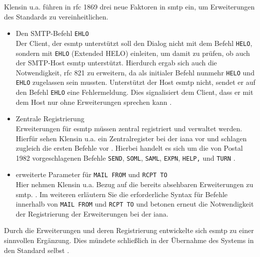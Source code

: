 
Klensin u.a. führen in \ac{rfc} 1869 drei neue Faktoren in \ac{smtp} ein, um Erweiterungen des Standards zu vereinheitlichen.

\begin{itemize}
	\item{Den SMTP-Befehl \verb+EHLO+}\\
	Der Client, der \ac{esmtp} unterstützt soll den Dialog nicht mit dem Befehl \verb+HELO+, sondern mit \verb+EHLO+ (Extended HELO) einleiten, um damit zu prüfen, ob auch der SMTP-Host \ac{esmtp} unterstützt. Hierdurch ergab sich auch die Notwendigkeit, \ac{rfc} 821 zu erweitern, da als initialer Befehl nunmehr \verb+HELO+ und \verb+EHLO+ zugelassen sein mussten. Unterstützt der Host \ac{esmtp} nicht, sendet er auf den Befehl \verb+EHLO+ eine Fehlermeldung. Dies signalisiert dem Client, dass er mit dem Host nur ohne Erweiterungen sprechen kann \citep[vgl.][S. 3 ff.]{rfc1869}.
	\item{Zentrale Registrierung}\\
	Erweiterungen für \ac{esmtp} müssen zentral registriert und verwaltet werden. Hierfür sehen Klensin u.a. ein Zentralregister bei der \ac{iana} vor und schlagen zugleich die ersten Befehle vor \citep[vgl.][7]{rfc1869}. Hierbei handelt es sich um die von Postal 1982 vorgeschlagenen Befehle \verb+SEND+, \verb+SOML+, \verb+SAML+, \verb+EXPN+, \verb+HELP,+ und \verb+TURN+ \citep[für die Befehle vgl.][S. 23 ff.]{rfc821}.
	\item{erweiterte Parameter für \verb+MAIL FROM+ und \verb+RCPT TO+}\\
	Hier nehmen Klensin u.a. Bezug auf die bereits absehbaren Erweiterungen zu \ac{smtp}.  \citep[][7]{rfc1869}. Im weiteren erläutern Sie die erforderliche Syntax für Befehle innerhalb von \verb+MAIL FROM+ und \verb+RCPT TO+ und betonen erneut die Notwendigkeit der Registrierung der Erweiterungen bei der \ac{iana}.
\end{itemize}

Durch die Erweiterungen und deren Registrierung entwickelte sich \ac{esmtp} zu einer sinnvollen Ergänzung. Dies mündete schließlich in der Übernahme des Systems in den Standard selbst \citep[vgl. u.a.][S. 7 ff]{rfc2821}.

